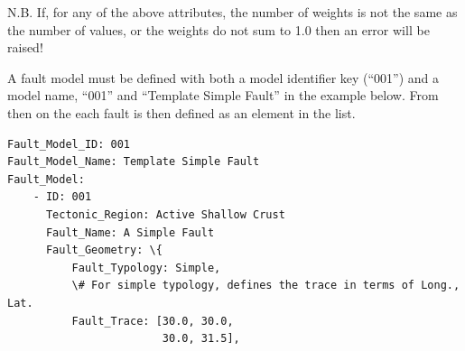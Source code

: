 N.B. If, for any of the above attributes, the number of weights is not the same as the number of values, or the weights do not sum to 1.0 then an error will be raised! 

A fault model must be defined with both a model identifier key (``001'') and a model name, ``001'' and ``Template Simple Fault'' in the example below. From then on the each fault is then defined as an element in the list.
       
\begin{Verbatim}[frame=single, commandchars=\\\{\}, fontsize=\scriptsize]
Fault_Model_ID: 001
Fault_Model_Name: Template Simple Fault
Fault_Model:
    - ID: 001
      Tectonic_Region: Active Shallow Crust
      Fault_Name: A Simple Fault
      Fault_Geometry: \{
          Fault_Typology: Simple,
          \# For simple typology, defines the trace in terms of Long., Lat.
          Fault_Trace: [30.0, 30.0,
                        30.0, 31.5],


\end{Verbatim}
